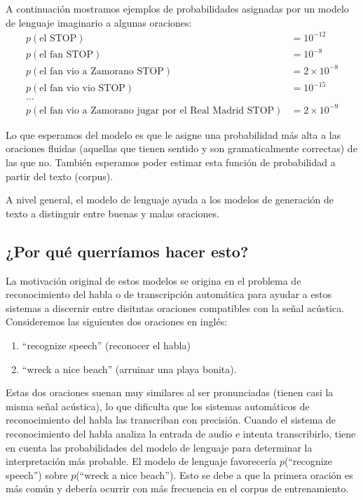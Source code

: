 \begin{example}
A continuación mostramos ejemplos de probabilidades asignadas por un modelo de lenguaje imaginario a algunas oraciones:
\begin{align*}
p(\text{el STOP}) &= 10^{-12} \\
p(\text{el fan STOP}) &= 10^{-8} \\
p(\text{el fan vio a Zamorano STOP}) &= 2 \times 10^{-8} \\
p(\text{el fan vio vio STOP}) &= 10^{-15} \\
\ldots \\
p(\text{el fan vio a Zamorano jugar por el Real Madrid STOP}) &= 2 \times 10^{-9}
\end{align*}
\end{example}



Lo que esperamos del modelo es que le asigne una probabilidad más alta a las oraciones fluidas (aquellas que tienen sentido y son gramaticalmente correctas) de las que no. También esperamos poder estimar esta función de probabilidad a partir del texto (corpus).

A nivel general, el modelo de lenguaje ayuda a los modelos de generación de texto a distinguir entre buenas y malas oraciones.


\subsection{¿Por qué querríamos hacer esto?}

La motivación original de estos modelos se origina en el problema de reconocimiento del habla o de transcripción automática para ayudar a estos sistemas a discernir entre disitntas oraciones compatibles con la señal acústica.  Consideremos las siguientes dos oraciones en inglés:
\begin{enumerate}
 \item ``recognize speech''  (reconocer el habla)
 \item ``wreck a nice beach'' (arruinar una playa bonita).
\end{enumerate}

Estas dos oraciones suenan muy similares al ser pronunciadas (tienen casi la misma señal acústica), lo que dificulta que los sistemas automáticos de reconocimiento del habla las transcriban con precisión. Cuando el sistema de reconocimiento del habla analiza la entrada de audio e intenta transcribirlo, tiene en cuenta las probabilidades del modelo de lenguaje para determinar la interpretación más probable.
El modelo de lenguaje favorecería $p$(``recognize speech'') sobre $p$(``wreck a nice beach'').
Esto se debe a que la primera oración es más común y debería ocurrir con más frecuencia en el corpus de entrenamiento.

